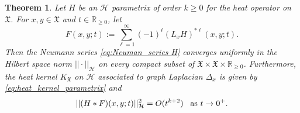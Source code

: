 \documentclass[11pt,reqno]{amsart}
\newtheorem{theorem}{Theorem}
\theoremstyle{remark}
\theoremstyle{definition}
\numberwithin{theorem}{section} \numberwithin{equation}{section}
\newcommand{\Hil}{\mathcal{H}}
\newcommand{\X}{\mathfrak{X}}
\begin{document}
\begin{theorem}
\label{thm: formula for H- heat kernel} Let $H$ be an $\mathcal{H}$ parametrix of
order $k\geq0$ for the heat operator on $\X$.  For $x,y\in \X$ and $t\in \mathbb{R}_{\geq 0}$, let
\begin{equation}\label{eq:Neuman_series H}
F(x,y;t):=\sum_{\ell=1}^{\infty}(-1)^{\ell}
(L_{x}H)^{\ast\ell}(x,y;t).
\end{equation}
Then the Neumann series \eqref{eq:Neuman_series H} converges uniformly in the Hilbert space norm $||\cdot||_{\mathcal{H}}$ on every compact subset of $\X\times \X\times\mathbb{R}_{\geq 0}$.
Furthermore, the heat kernel $K_{\X}$ on $\Hil$
associated to graph Laplacian $\Delta_{x}$ is given by \eqref{eq:heat_kernel_parametrix}
and
$$
||(H\ast F)(x,y;t)||_\mathcal{H}^2
= O(t^{k+2})
\,\,\,\,\,
\text{\rm as $t \rightarrow 0^+$.}
$$
\end{theorem}
\end{document}
